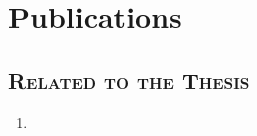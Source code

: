 \chapter*{Publications}\label{publications} 

\section*{\fontsize{12pt}{16pt}\scshape Related to the Thesis}

\begin{enumerate}
    \item {}\label{pub:pub01}
\end{enumerate}



